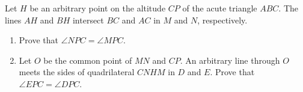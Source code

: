 Let $H$ be an arbitrary point on the altitude $CP$ of the acute triangle $ABC$. The lines $AH$ and $BH$ intersect $BC$ and $AC$ in $M$ and $N$, respectively.
\begin{enumerate}[label = (\alph*)]
  \item Prove that $\angle NPC =\angle MPC$.
  \item Let $O$ be the common point of $MN$ and $CP$. An arbitrary line through $O$ meets the sides of quadrilateral $CNHM$ in $D$ and $E$. Prove that $\angle EPC =\angle DPC$.
\end{enumerate}
